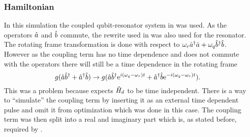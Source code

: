 \documentclass[main.tex]{subfiles}
\begin{document}
\subsubsection{Hamiltonian}
In this simulation the coupled qubit-resonator system in  was used.
As the operators \(\hat{a}\) and \(\hat{b}\) commute, the rewrite used in  was also used for the resonator.
The rotating frame transformation is done with respect to \(\omega_{r} \hat{a}^\dagger\hat{a} + \omega_{q} \hat{b}^\dagger\hat{b} \).
However as the coupling term has no time dependence and does not commute with the operators there will still be a time dependence in the rotating frame
\begin{equation}
    g(\hat{a}\hat{b}^\dagger + \hat{a}^\dagger\hat{b}) \rightarrow g(\hat{a}\hat{b}^\dagger\mathrm{e}^{i(\omega_q-\omega_r)t} + \hat{a}^\dagger\hat{b}\mathrm{e}^{-i(\omega_q-\omega_r)t}).
\end{equation}
This was a problem because \krotov{} expects \(\hat{H}_d\) to be time independent.
There is a way to ``simulate'' the coupling term by inserting it as an external time dependent pulse and omit it from optimization which was done in this case.
The coupling term was then split into a real and imaginary part which is, as stated before, required by \krotov{}.
\end{document}
